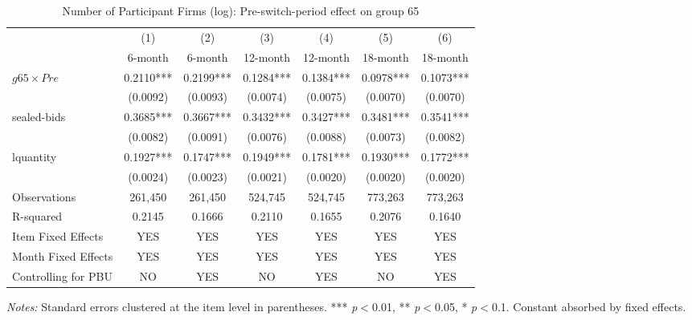 \begin{table}[htbp]
\centering
\caption{Number of Participant Firms (log): Pre-switch-period effect on group 65}
\label{tab:participants}
\begin{adjustbox}{max width=\textwidth}
\begin{threeparttable}
\small
\begin{tabular}{lcccccc}
\toprule
 & (1) & (2) & (3) & (4) & (5) & (6) \\
 & 6-month & 6-month & 12-month & 12-month & 18-month & 18-month \\
\midrule
$g65 \times Pre$ & 0.2110*** & 0.2199*** & 0.1284*** & 0.1384*** & 0.0978*** & 0.1073*** \\
 & (0.0092) & (0.0093) & (0.0074) & (0.0075) & (0.0070) & (0.0070) \\
sealed-bids & 0.3685*** & 0.3667*** & 0.3432*** & 0.3427*** & 0.3481*** & 0.3541*** \\
 & (0.0082) & (0.0091) & (0.0076) & (0.0088) & (0.0073) & (0.0082) \\
lquantity & 0.1927*** & 0.1747*** & 0.1949*** & 0.1781*** & 0.1930*** & 0.1772*** \\
 & (0.0024) & (0.0023) & (0.0021) & (0.0020) & (0.0020) & (0.0020) \\
\midrule
Observations & 261,450 & 261,450 & 524,745 & 524,745 & 773,263 & 773,263 \\
R-squared & 0.2145 & 0.1666 & 0.2110 & 0.1655 & 0.2076 & 0.1640 \\
Item Fixed Effects & YES & YES & YES & YES & YES & YES \\
Month Fixed Effects & YES & YES & YES & YES & YES & YES \\
Controlling for PBU & NO & YES & NO & YES & NO & YES \\
\bottomrule
\end{tabular}
\begin{tablenotes}
\small
\item \textit{Notes:} Standard errors clustered at the item level in parentheses.
*** \textit{p}$<$0.01, ** \textit{p}$<$0.05, * \textit{p}$<$0.1.
Constant absorbed by fixed effects.
\end{tablenotes}
\end{threeparttable}
\end{adjustbox}
\end{table}
